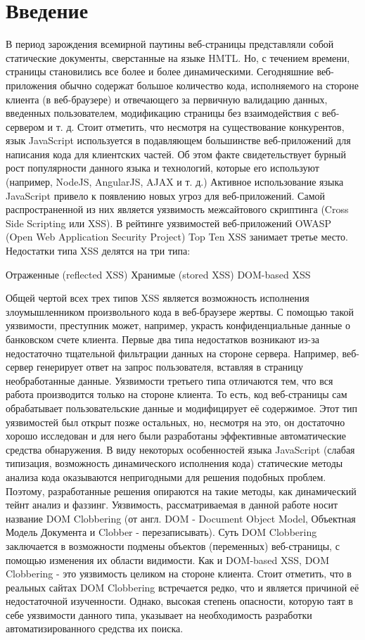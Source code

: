 
\chapter{Введение}\label{Introduction}

В период зарождения всемирной паутины веб-страницы представляли собой статические документы, сверстанные на языке HMTL. Но, с течением времени, страницы становились все более и более динамическими. Сегодняшние веб-приложения обычно содержат большое количество кода, исполняемого на стороне клиента (в веб-браузере) и отвечающего за первичную валидацию данных, введенных пользователем, модификацию страницы без взаимодействия с веб-сервером и т. д.  Стоит отметить, что несмотря на существование конкурентов, язык JavaScript используется в подавляющем большинстве веб-приложений для написания кода для клиентских частей. Об этом факте свидетельствует бурный рост популярности данного языка и технологий, которые его используют (например, NodeJS, AngularJS, AJAX и т. д.)
Активное использование языка JavaScript  привело к появлению новых угроз для веб-приложений. Самой распространенной из них является уязвимость межсайтового скриптинга (Cross Side Scripting или XSS). В рейтинге уязвимостей веб-приложений OWASP (Open Web Application Security Project) Top Ten XSS занимает третье место. Недостатки типа XSS делятся на три типа:

Отраженные (reflected XSS)
Хранимые (stored XSS)
DOM-based XSS

 Общей чертой всех трех типов XSS является возможность исполнения злоумышленником произвольного кода в веб-браузере жертвы. С помощью такой уязвимости, преступник может, например, украсть конфиденциальные данные о банковском счете клиента.
 Первые два типа недостатков возникают из-за недостаточно тщательной фильтрации данных на стороне сервера. Например, веб-сервер генерирует ответ на запрос пользователя, вставляя в страницу необработанные данные.
  Уязвимости третьего типа отличаются тем, что вся работа производится только на стороне клиента. То есть, код веб-страницы сам обрабатывает пользовательские данные и модифицирует её содержимое. Этот тип уязвимостей был открыт позже остальных, но, несмотря на это, он достаточно хорошо исследован и для него были разработаны эффективные автоматические средства обнаружения. В виду некоторых особенностей языка JavaScript (слабая типизация, возможность динамического исполнения кода) статические методы анализа кода оказываются непригодными для решения подобных проблем. Поэтому, разработанные решения опираются на такие методы, как динамический тейнт анализ и фаззинг.
 Уязвимость, рассматриваемая в данной работе носит название DOM Clobbering (от англ. DOM - Document Object Model, Объектная Модель Документа и Clobber - перезаписывать).  Суть DOM Clobbering заключается в возможности подмены объектов (переменных) веб-страницы, с помощью изменения их области видимости. Как и DOM-based XSS, DOM Clobbering - это уязвимость целиком на стороне клиента.
 Стоит отметить, что в реальных сайтах DOM Clobbering встречается редко, что и является причиной её недостаточной изученности. Однако, высокая степень опасности, которую таят в себе уязвимости данного типа, указывает на необходимость разработки автоматизированного средства их поиска.